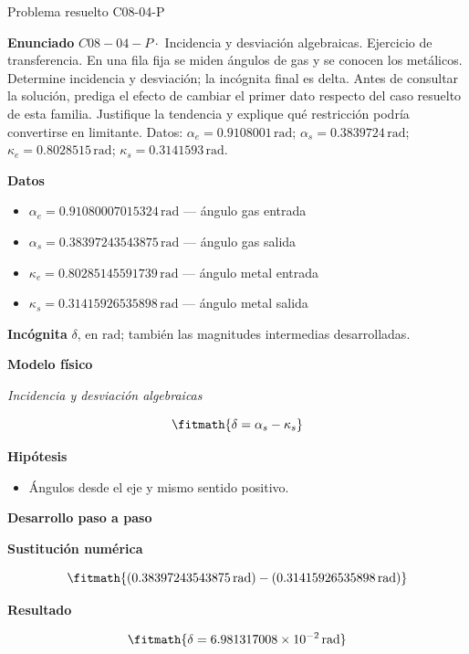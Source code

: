 \documentclass[10pt,openany]{book}
\begin{document}
\begin{studiumworked}{Problema resuelto C08-04-P}


\noindent\textbf{Enunciado}
\(C08-04-P \cdot\) Incidencia y desviación algebraicas. Ejercicio de transferencia. En una fila fija se miden ángulos de gas y se conocen los metálicos. Determine incidencia y desviación; la incógnita final es delta. Antes de consultar la solución, prediga el efecto de cambiar el primer dato respecto del caso resuelto de esta familia. Justifique la tendencia y explique qué restricción podría convertirse en limitante. Datos: \(\alpha_e=0.9108001\, \mathrm{rad}\); \(\alpha_s=0.3839724\, \mathrm{rad}\); \(\kappa_e=0.8028515\, \mathrm{rad}\); \(\kappa_s=0.3141593\, \mathrm{rad}\).

\noindent\textbf{Datos}
\begin{itemize}
\item $\alpha_e = 0.91080007015324\,\mathrm{rad}$ — ángulo gas entrada
\item $\alpha_s = 0.38397243543875\,\mathrm{rad}$ — ángulo gas salida
\item $\kappa_e = 0.80285145591739\,\mathrm{rad}$ — ángulo metal entrada
\item $\kappa_s = 0.31415926535898\,\mathrm{rad}$ — ángulo metal salida
\end{itemize}

\noindent\textbf{Incógnita}
$\delta$, en $\mathrm{rad}$; también las magnitudes intermedias desarrolladas.

\noindent\textbf{Modelo físico}

\noindent\textit{Incidencia y desviación algebraicas}

\[
\fitmath{\delta=\alpha_s - \kappa_s}
\]

\noindent\textbf{Hipótesis}
\begin{itemize}
\item Ángulos desde el eje y mismo sentido positivo.
\end{itemize}

\noindent\textbf{Desarrollo paso a paso}



\noindent\textbf{Sustitución numérica}

\[
\fitmath{\left(0.38397243543875\,\mathrm{rad}\right) - \left(0.31415926535898\,\mathrm{rad}\right)}
\]

\noindent\textbf{Resultado}

\[
\fitmath{\delta=6.981317008\times10^{-2}\,\mathrm{rad}}
\]


\end{studiumworked}
\end{document}
